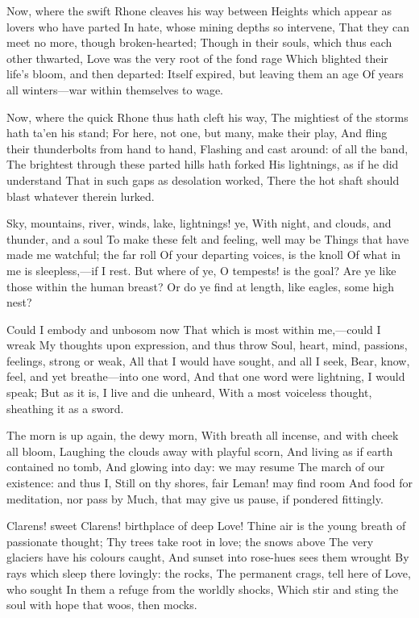 \documentclass[10pt,twocolumn]{book}
\begin{document}
   Now, where the swift Rhone cleaves his way between
   Heights which appear as lovers who have parted
   In hate, whose mining depths so intervene,
   That they can meet no more, though broken-hearted;
   Though in their souls, which thus each other thwarted,
   Love was the very root of the fond rage
   Which blighted their life's bloom, and then departed:
   Itself expired, but leaving them an age
Of years all winters---war within themselves to wage.


   Now, where the quick Rhone thus hath cleft his way,
   The mightiest of the storms hath ta'en his stand;
   For here, not one, but many, make their play,
   And fling their thunderbolts from hand to hand,
   Flashing and cast around:  of all the band,
   The brightest through these parted hills hath forked
   His lightnings, as if he did understand
   That in such gaps as desolation worked,
There the hot shaft should blast whatever therein lurked.


   Sky, mountains, river, winds, lake, lightnings! ye,
   With night, and clouds, and thunder, and a soul
   To make these felt and feeling, well may be
   Things that have made me watchful; the far roll
   Of your departing voices, is the knoll
   Of what in me is sleepless,---if I rest.
   But where of ye, O tempests! is the goal?
   Are ye like those within the human breast?
Or do ye find at length, like eagles, some high nest?


   Could I embody and unbosom now
   That which is most within me,---could I wreak
   My thoughts upon expression, and thus throw
   Soul, heart, mind, passions, feelings, strong or weak,
   All that I would have sought, and all I seek,
   Bear, know, feel, and yet breathe---into one word,
   And that one word were lightning, I would speak;
   But as it is, I live and die unheard,
With a most voiceless thought, sheathing it as a sword.


   The morn is up again, the dewy morn,
   With breath all incense, and with cheek all bloom,
   Laughing the clouds away with playful scorn,
   And living as if earth contained no tomb,\textemdash
   And glowing into day:  we may resume
   The march of our existence:  and thus I,
   Still on thy shores, fair Leman! may find room
   And food for meditation, nor pass by
Much, that may give us pause, if pondered fittingly.


   Clarens! sweet Clarens! birthplace of deep Love!
   Thine air is the young breath of passionate thought;
   Thy trees take root in love; the snows above
   The very glaciers have his colours caught,
   And sunset into rose-hues sees them wrought
   By rays which sleep there lovingly:  the rocks,
   The permanent crags, tell here of Love, who sought
   In them a refuge from the worldly shocks,
Which stir and sting the soul with hope that woos, then mocks.
\end{document}
